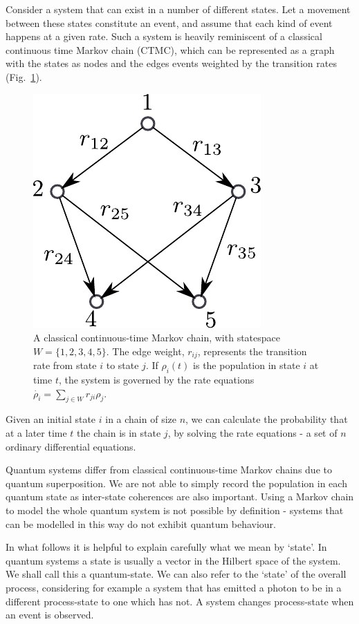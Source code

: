 Consider a system that can exist in a number of different states. Let a movement between these states constitute an event, and assume that each kind of event happens at a given rate. Such a system is heavily reminiscent of a classical continuous time Markov chain (CTMC), which can be represented as a graph with the states as nodes and the edges events weighted by the transition rates (Fig.~\ref{markov_chain}). 
\begin{figure}[htb]
  \begin{center}
  \includegraphics[]{assets/markov_chain.pdf}
  \end{center}
  \caption{A classical continuous-time Markov chain, with statespace $W = \{1,2,3,4,5\}$. The edge weight, $r_{ij}$, represents the transition rate from state $i$ to state $j$. If $\rho_i(t)$ is the population in state $i$ at time $t$, the system is governed by the rate equations $\dot{\rho_i} = \sum_{j\in W} r_{ji}\rho_j$.}
  \label{markov_chain}
\end{figure}
Given an initial state $i$ in a chain of size $n$, we can calculate the probability that at a later time $t$ the chain is in state $j$, by solving the rate equations - a set of $n$ ordinary differential equations.

Quantum systems differ from classical continuous-time Markov chains due to quantum superposition. We are not able to simply record the population in each quantum state as inter-state coherences are also important. Using a Markov chain to model the whole quantum system is not possible by definition - systems that can be modelled in this way do not exhibit quantum behaviour.

In what follows it is helpful to explain carefully what we mean by `state'. In quantum systems a state is usually a vector in the Hilbert space of the system. We shall call this a quantum-state. We can also refer to the `state' of the overall process, considering for example a system that has emitted a photon to be in a different process-state to one which has not. A system changes process-state when an event is observed.

